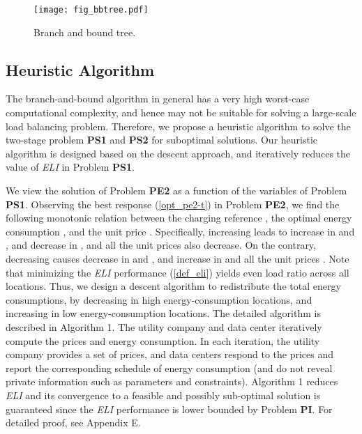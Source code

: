 \documentclass[journal]{IEEEtran}
\begin{document}
	\begin{figure}[t]
		\centering
		\texttt{[image: fig\_bbtree.pdf]}
		\caption{\label{fig_bbtree}Branch and bound tree.}
\end{figure}
	
	
	\subsection{Heuristic Algorithm}
	The branch-and-bound algorithm in general has a very high worst-case computational complexity, and hence may not be suitable for solving a large-scale load balancing problem. Therefore, we propose a heuristic algorithm to solve the two-stage problem \textbf{PS1} and \textbf{PS2} for suboptimal solutions. Our heuristic algorithm is designed based on the descent approach, and iteratively reduces the value of \emph{ELI} in Problem \textbf{PS1}.
	
	We view the solution of Problem \textbf{PE2} as a function of the variables of Problem \textbf{PS1}. Observing the best response (\ref{opt_pe2-t}) in Problem \textbf{PE2}, we find the following monotonic relation between the charging reference , the optimal energy consumption , and the unit price . Specifically, increasing  leads to increase in  and , and decrease in , and all the unit prices  also decrease. On the contrary, decreasing  causes decrease in  and , and increase in  and all the unit prices . Note that minimizing the \emph{ELI} performance (\ref{def_eli}) yields even load ratio  across all locations. Thus, we design a descent algorithm to redistribute the total energy consumptions, by decreasing  in high energy-consumption locations, and increasing  in low energy-consumption locations. The detailed algorithm is described in Algorithm 1. The utility company and data center iteratively compute the prices and energy consumption. In each iteration, the utility company provides a set of prices, and data centers respond to the prices and report the corresponding schedule of energy consumption (and do not reveal private information such as parameters and constraints). Algorithm 1 reduces \emph{ELI} and its convergence to a feasible and possibly sub-optimal solution is guaranteed since the \emph{ELI} performance is lower bounded by Problem \textbf{PI}. For detailed proof, see Appendix E.
	
\end{document}
